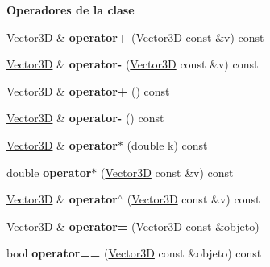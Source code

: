 \begin{Indent}{\bf Operadores de la clase}\par
\begin{DoxyCompactItemize}
\item 
\hyperlink{classed_1_1Vector3D}{Vector3D} \& {\bfseries operator+} (\hyperlink{classed_1_1Vector3D}{Vector3D} const \&v) const \hypertarget{classed_1_1Vector3D_a2621602374ee83370398bf68aabab7dc}{}\label{classed_1_1Vector3D_a2621602374ee83370398bf68aabab7dc}

\item 
\hyperlink{classed_1_1Vector3D}{Vector3D} \& {\bfseries operator-\/} (\hyperlink{classed_1_1Vector3D}{Vector3D} const \&v) const \hypertarget{classed_1_1Vector3D_adc208536fe841f76ad921b385198d996}{}\label{classed_1_1Vector3D_adc208536fe841f76ad921b385198d996}

\item 
\hyperlink{classed_1_1Vector3D}{Vector3D} \& {\bfseries operator+} () const \hypertarget{classed_1_1Vector3D_ad1074a8514d7e115cd7cd0e095d06aba}{}\label{classed_1_1Vector3D_ad1074a8514d7e115cd7cd0e095d06aba}

\item 
\hyperlink{classed_1_1Vector3D}{Vector3D} \& {\bfseries operator-\/} () const \hypertarget{classed_1_1Vector3D_afe65721e62e3e59b07a5dfd0ef3b75e3}{}\label{classed_1_1Vector3D_afe65721e62e3e59b07a5dfd0ef3b75e3}

\item 
\hyperlink{classed_1_1Vector3D}{Vector3D} \& {\bfseries operator$\ast$} (double k) const \hypertarget{classed_1_1Vector3D_a3451f84f6ae3765b576790fd6e38a8a6}{}\label{classed_1_1Vector3D_a3451f84f6ae3765b576790fd6e38a8a6}

\item 
double {\bfseries operator$\ast$} (\hyperlink{classed_1_1Vector3D}{Vector3D} const \&v) const \hypertarget{classed_1_1Vector3D_a8ff476655db397dbb593e1d74271424a}{}\label{classed_1_1Vector3D_a8ff476655db397dbb593e1d74271424a}

\item 
\hyperlink{classed_1_1Vector3D}{Vector3D} \& {\bfseries operator$^\wedge$} (\hyperlink{classed_1_1Vector3D}{Vector3D} const \&v) const \hypertarget{classed_1_1Vector3D_a711662d59e9aceb8f2f8175e85e38b14}{}\label{classed_1_1Vector3D_a711662d59e9aceb8f2f8175e85e38b14}

\item 
\hyperlink{classed_1_1Vector3D}{Vector3D} \& {\bfseries operator=} (\hyperlink{classed_1_1Vector3D}{Vector3D} const \&objeto)\hypertarget{classed_1_1Vector3D_a2441a3f37b47640af3ba904e9b84ff47}{}\label{classed_1_1Vector3D_a2441a3f37b47640af3ba904e9b84ff47}

\item 
bool {\bfseries operator==} (\hyperlink{classed_1_1Vector3D}{Vector3D} const \&objeto) const \hypertarget{classed_1_1Vector3D_a771d4119e3ab6f17828f4cf194bf8721}{}\label{classed_1_1Vector3D_a771d4119e3ab6f17828f4cf194bf8721}

\end{DoxyCompactItemize}
\end{Indent}
